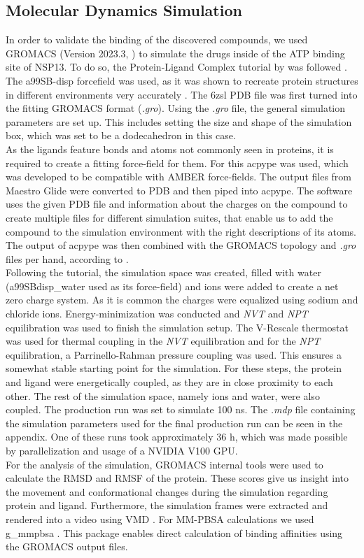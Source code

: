 \documentclass[11pt, letterpaper, titlepage]{article}
\renewcommand{\cite}{\parencite}
\begin{document}
\subsection{Molecular Dynamics Simulation}
In order to validate the binding of the discovered compounds, we used GROMACS (Version 2023.3, \textcite{packageGROMACS}) to simulate the drugs inside of the ATP binding site of NSP13. To do so, the Protein-Ligand Complex tutorial by  was followed \cite{Lemkul2018}. The a99SB-disp forcefield was used, as it was shown to recreate protein structures in different environments very accurately \cite{Forcefield}. The 6zsl PDB file was first turned into the fitting GROMACS format (\textit{.gro}). Using the \textit{.gro} file, the general simulation parameters are set up. This includes setting the size and shape of the simulation box, which was set to be a dodecahedron in this case. \\ 
As the ligands feature bonds and atoms not commonly seen in proteins, it is required to create a fitting force-field for them. For this acpype \cite{acpype} was used, which was developed to be compatible with AMBER force-fields. The output files from Maestro Glide were converted to PDB and then piped into acpype. The software uses the given PDB file and information about the charges on the compound to create multiple files for different simulation suites, that enable us to add the compound to the simulation environment with the right descriptions of its atoms.  The output of acpype was then combined with the GROMACS topology and \textit{.gro} files per hand, according to . \\
Following the tutorial, the simulation space was created, filled with water (a99SBdisp\_water used as its force-field) and ions were added to create a net zero charge system. As it is common the charges were equalized using sodium and chloride ions. Energy-minimization was conducted and \textit{NVT} and \textit{NPT} equilibration was used to finish the simulation setup. The V-Rescale thermostat was used for thermal coupling in the \textit{NVT} equilibration and for the \textit{NPT} equilibration, a Parrinello-Rahman pressure coupling was used. This ensures a somewhat stable starting point for the simulation. For these steps, the protein and ligand were energetically coupled, as they are in close proximity to each other. The rest of the simulation space, namely ions and water, were also coupled. The production run was set to simulate 100 ns. The \textit{.mdp} file containing the simulation parameters used for the final production run can be seen in the appendix. One of these runs took approximately  36 h, which was made possible by parallelization and usage of a NVIDIA V100 GPU. \\ 
For the analysis of the simulation, GROMACS internal tools were used to calculate the RMSD and RMSF of the protein. These scores give us insight into the movement and conformational changes during the simulation regarding protein and ligand. Furthermore, the simulation frames were extracted and rendered into a video using VMD \cite{VMD}. For MM-PBSA calculations we used g\_mmpbsa \cite{MMPBSA1, MMPBSA2}. This package enables direct calculation of binding affinities using the GROMACS output files.
\end{document}
